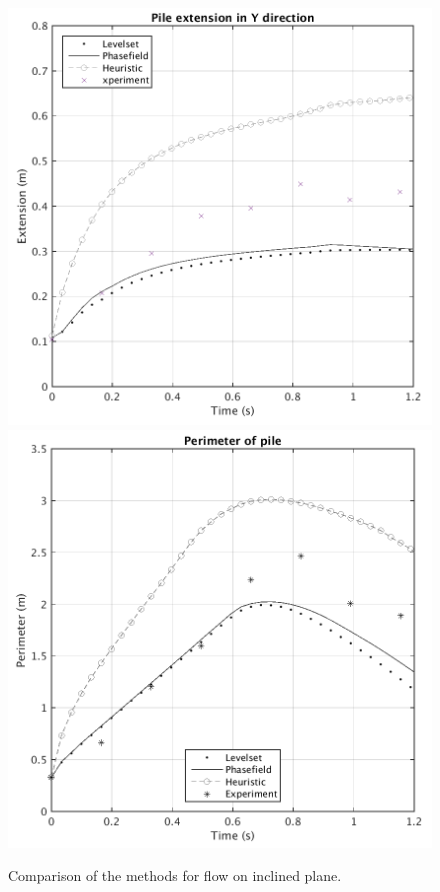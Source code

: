 \documentclass[review]{elsarticle}
\begin{document}
\begin{figure}[H]
\begin{minipage}[b]{.5\textwidth}
                  \label{area}
        \end{minipage}
        \begin{minipage}[b]{.5\textwidth}
                \centering
                \includegraphics[width=1\textwidth]{IMAGES/yextend.png}
                  \label{y_extent}
                \includegraphics[width=1\textwidth]{IMAGES/perimeter.png}
                  \label{Perimeter}
        \end{minipage}
        \caption{Comparison of the methods for flow on inclined plane.}
        \label{compinc_inclined}
\end{figure}
\end{document}
